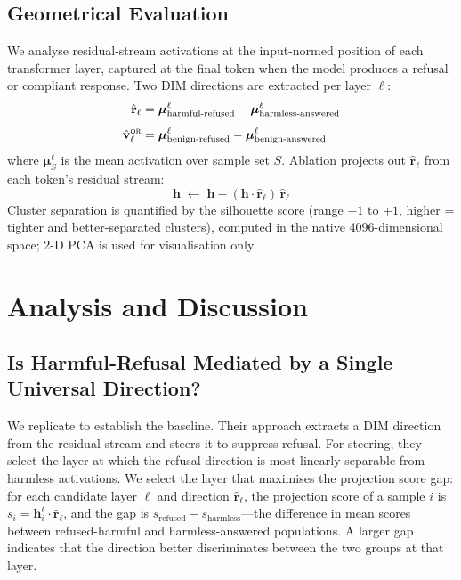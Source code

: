 \documentclass[11pt]{article}
\newcommand{\OR}{\textsc{or}}
\begin{document}
\subsection{Geometrical Evaluation}

We analyse residual-stream activations at the input-normed position of each transformer layer,
captured at the final token when the model produces a refusal or compliant response.
Two DIM directions are extracted per layer $\ell$:
\begin{align}
  \hat{\mathbf{r}}_\ell &=
    \boldsymbol{\mu}^\ell_{\text{harmful-refused}} -
    \boldsymbol{\mu}^\ell_{\text{harmless-answered}}
   \\[4pt]
  \hat{\mathbf{v}}^\OR_\ell &=
    \boldsymbol{\mu}^\ell_{\text{benign-refused}} -
    \boldsymbol{\mu}^\ell_{\text{benign-answered}}
\end{align}
where $\boldsymbol{\mu}^\ell_S$ is the mean activation over sample set $S$.
Ablation projects out $\hat{\mathbf{r}}_\ell$ from each token's residual stream:
\begin{equation}
  \mathbf{h} \;\leftarrow\; \mathbf{h} - (\mathbf{h} \cdot \hat{\mathbf{r}}_\ell)\,\hat{\mathbf{r}}_\ell
\end{equation}
Cluster separation is quantified by the silhouette score \citep{rousseeuw1987silhouettes}
(range $-1$ to $+1$, higher = tighter and better-separated clusters),
computed in the native 4096-dimensional space; 2-D PCA is used for visualisation only.

\FloatBarrier
\section{Analysis and Discussion}
\label{sec:results}



\subsection{Is Harmful-Refusal Mediated by a Single Universal Direction?}
\label{sec:arditi}

We replicate \citet{arditi2024refusal} to establish the baseline.
Their approach extracts a DIM direction from the residual stream and steers
it to suppress refusal. For steering,
they select the layer at which the refusal direction is
most linearly separable from harmless activations.
We select the layer that maximises the
projection score gap: for each candidate layer $\ell$ and direction
$\hat{\mathbf{r}}_\ell$, the projection score of a sample $i$ is
$s_i = \mathbf{h}^\ell_i \cdot \hat{\mathbf{r}}_\ell$, and the gap is
$\bar{s}_{\text{refused}} - \bar{s}_{\text{harmless}}$---the difference in
mean scores between refused-harmful and harmless-answered populations.
A larger gap indicates that the direction better discriminates between the two
groups at that layer.
\end{document}
